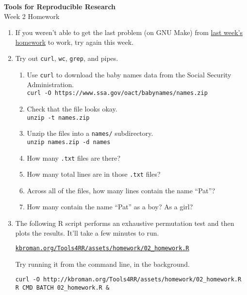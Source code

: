 \documentclass[12pt]{article}
\newcommand{\ttsm}{\tt \small}
\begin{document}
\thispagestyle{empty}

\textbf{Tools for Reproducible Research} \\
Week 2 Homework

\bigskip

\begin{enumerate}

\item If you weren't able to get the last problem (on GNU Make) from
  \href{http://kbroman.org/Tools4RR/assets/homework/01_homework.pdf}{last week's homework}
  to work, try again this week.

\item Try out {\ttsm curl}, {\ttsm wc}, {\ttsm grep}, and pipes.

  \begin{enumerate}
  \item Use {\ttsm curl} to download the baby names data from the
    Social Security Administration. \\
    {\ttsm curl -O https://www.ssa.gov/oact/babynames/names.zip}

  \item Check that the file looks okay.\\
    {\ttsm unzip -t names.zip}

  \item Unzip the files into a {\ttsm names/} subdirectory.\\
    {\ttsm unzip names.zip -d names}

  \item How many {\ttsm .txt} files are there?

  \item How many total lines are in those {\ttsm .txt} files?

  \item Across all of the files, how many lines contain the name
    ``Pat''?

  \item How many contain the name ``Pat'' as a boy? As a girl?
  \end{enumerate}


\item The following R script performs an exhaustive permutation test and
  then plots the results. It'll take a few minutes to run.

  \href{http://kbroman.org/Tools4RR/assets/homework/02_homework.R}{\ttsm kbroman.org/Tools4RR/assets/homework/02\_homework.R}

  Try running it from the command line, in the background.

  {\ttsm curl -O http://kbroman.org/Tools4RR/assets/homework/02\_homework.R} \\
  {\ttsm R CMD BATCH 02\_homework.R \&}

\end{enumerate}
\end{document}
